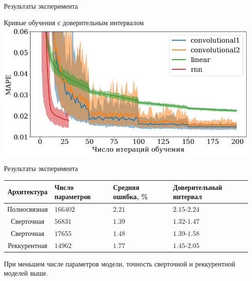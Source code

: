 \documentclass{beamer}
\begin{document}
\begin{frame}{Результаты эксперимента}
\begin{block}{Кривые обучения с доверительным интервалом}
\includegraphics[scale=0.33]{img/mape.png}
\end{block}

\end{frame}

\begin{frame}{Результаты эксперимента}

\begin{center}

\begin{tabular}{|c|m{1.9cm}|m{2.3cm}|m{2.5cm}|}
\hline
Архитектура & Число \mbox{параметров} & Средняя ошибка, \% & Доверительный интервал\tabularnewline
\hline
Полносвязная & $166402$ & $2.21$ & $2.15$-$2.24$\tabularnewline
Сверточная & $56831$\ & $1.39$ & $1.32$-$1.47$\tabularnewline
Сверточная & $17655$ & $1.48$ & $1.39$-$1.58$\tabularnewline
Реккурентная & $14962$ & $1.77$ & $1.45$-$2.05$\tabularnewline
\hline
\end{tabular}
\end{center}
При меньшем числе параметров модели, точность сверточной и реккурентной моделей выше.

\end{frame}
\end{document}
